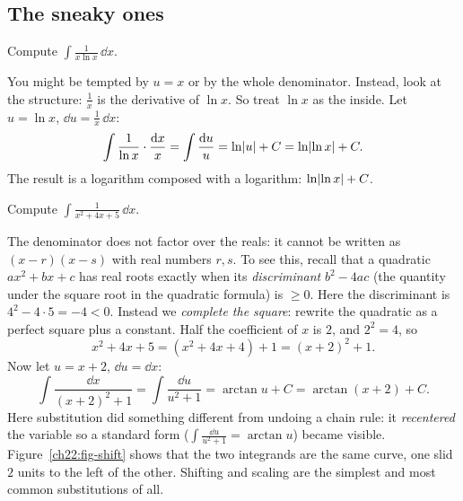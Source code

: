 \subsection{The sneaky ones}

\begin{example}
\label{ch22:ex-sneaky1}
Compute $\displaystyle \int \frac{1}{x\ln x}\,\dd x$.

You might be tempted by $u = x$ or by the whole denominator. Instead, look at the
structure: $\tfrac1x$ is the derivative of $\ln x$. So treat $\ln x$ as the
inside. Let $u = \ln x$, $\dd u = \tfrac1x\,\dd x$:
\[
  \int \frac{1}{\ln x}\cdot\frac{\mathrm{d} x}{x} = \int \frac{\mathrm{d} u}{u}
   = \ln\lvert u\rvert + C = \ln\lvert\ln x\rvert + C.
\]
The result is a logarithm composed with a logarithm: $\ln\lvert\ln x\rvert + C$.
\end{example}

\begin{example}
\label{ch22:ex-square}
Compute $\displaystyle \int \frac{1}{x^2+4x+5}\,\dd x$.

The denominator does not factor over the reals: it cannot be written as
$(x-r)(x-s)$ with real numbers $r, s$. To see this, recall that a quadratic
$ax^2+bx+c$ has real roots exactly when its \emph{discriminant} $b^2-4ac$ (the
quantity under the square root in the quadratic formula) is $\ge 0$. Here the
discriminant is $4^2 - 4\cdot 5 = -4 < 0$. Instead we \emph{complete the square}: rewrite the quadratic as a
perfect square plus a constant. Half the coefficient of $x$ is $2$, and $2^2 = 4$, so
\[
  x^2+4x+5 = (x^2+4x+4) + 1 = (x+2)^2 + 1.
\]
Now let $u = x+2$, $\dd u = \dd x$:
\[
  \int \frac{\dd x}{(x+2)^2+1} = \int \frac{\dd u}{u^2+1} = \arctan u + C
   = \arctan(x+2) + C.
\]
Here substitution did something different from undoing a chain rule: it
\emph{recentered} the variable so a standard form ($\int \frac{\dd u}{u^2+1} =
\arctan u$) became visible. Figure~\ref{ch22:fig-shift} shows that the two
integrands are the same curve, one slid $2$ units to the left of the other.
Shifting and scaling are the simplest and most common substitutions of all.
\end{example}

